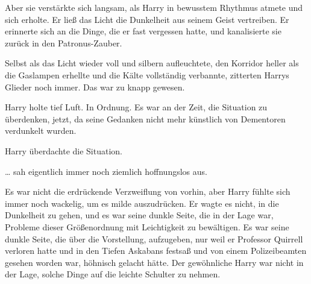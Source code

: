Aber sie verstärkte sich langsam, als Harry in bewusstem Rhythmus atmete und sich erholte. Er ließ das Licht die Dunkelheit aus seinem Geist vertreiben. Er erinnerte sich an die Dinge, die er fast vergessen hatte, und kanalisierte sie zurück in den Patronus-Zauber.

Selbst als das Licht wieder voll und silbern aufleuchtete, den Korridor heller als die Gaslampen erhellte und die Kälte vollständig verbannte, zitterten Harrys Glieder noch immer. Das war zu knapp gewesen.

Harry holte tief Luft. In Ordnung. Es war an der Zeit, die Situation zu überdenken, jetzt, da seine Gedanken nicht mehr künstlich von Dementoren verdunkelt wurden.

Harry überdachte die Situation.

… sah eigentlich immer noch ziemlich hoffnungslos aus.

Es war nicht die erdrückende Verzweiflung von vorhin, aber Harry fühlte sich immer noch wackelig, um es milde auszudrücken. Er wagte es nicht, in die Dunkelheit zu gehen, und es war seine dunkle Seite, die in der Lage war, Probleme dieser Größenordnung mit Leichtigkeit zu bewältigen. Es war seine dunkle Seite, die über die Vorstellung, aufzugeben, nur weil er Professor Quirrell verloren hatte und in den Tiefen Askabans festsaß und von einem Polizeibeamten gesehen worden war, höhnisch gelacht hätte. Der gewöhnliche Harry war nicht in der Lage, solche Dinge auf die leichte Schulter zu nehmen.

